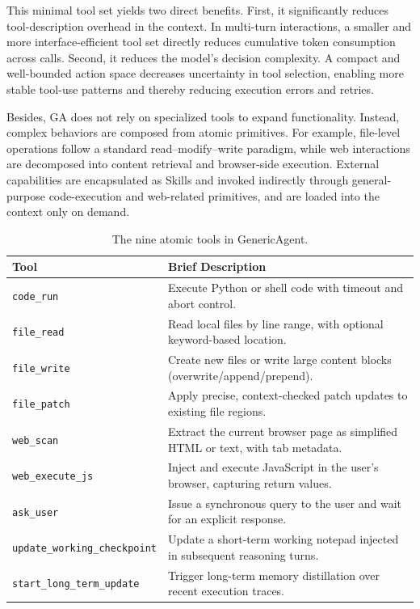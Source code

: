 This minimal tool set yields two direct benefits. First, it significantly reduces tool-description overhead in the context. In multi-turn interactions, a smaller and more interface-efficient tool set directly reduces cumulative token consumption across calls. Second, it reduces the model’s decision complexity. A compact and well-bounded action space decreases uncertainty in tool selection, enabling more stable tool-use patterns and thereby reducing execution errors and retries.

Besides, GA does not rely on specialized tools to expand functionality. Instead, complex behaviors are composed from atomic primitives. For example, file-level operations follow a standard read–modify–write paradigm, while web interactions are decomposed into content retrieval and browser-side execution. External capabilities are encapsulated as Skills and invoked indirectly through general-purpose code-execution and web-related primitives, and are loaded into the context only on demand. 


\begin{table}[t]
    \centering
    \caption{The nine atomic tools in GenericAgent.}
    \label{tab:tools}
    \begin{tabular}{ll}
    \toprule
    \textbf{Tool} & \textbf{Brief Description} \\
    \midrule
    \texttt{code\_run} &
    Execute Python or shell code with timeout and abort control. \\
    \texttt{file\_read} &
    Read local files by line range, with optional keyword-based location. \\
    \texttt{file\_write} &
    Create new files or write large content blocks (overwrite/append/prepend). \\
    \texttt{file\_patch} &
    Apply precise, context-checked patch updates to existing file regions. \\
    \texttt{web\_scan} &
    Extract the current browser page as simplified HTML or text, with tab metadata. \\
    \texttt{web\_execute\_js} &
    Inject and execute JavaScript in the user’s browser, capturing return values. \\
    \texttt{ask\_user} &
    Issue a synchronous query to the user and wait for an explicit response. \\
    \texttt{update\_working\_checkpoint} &
    Update a short-term working notepad injected in subsequent reasoning turns. \\
    \texttt{start\_long\_term\_update} &
    Trigger long-term memory distillation over recent execution traces. \\
    \bottomrule
    \end{tabular}
    \end{table}

